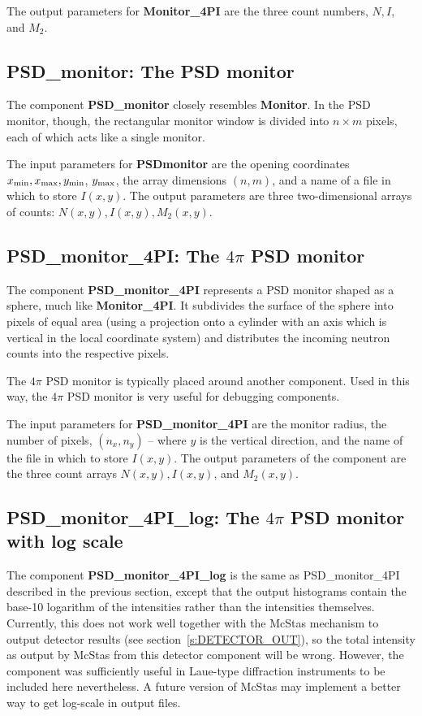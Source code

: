 The output parameters for {\bf Monitor\_4PI} are the three count numbers, $N, I$, and $M_2$.

\subsection{PSD\_monitor: The PSD monitor}
The component {\bf PSD\_monitor} closely resembles 
{\bf Monitor}.
In the PSD monitor, though, the rectangular monitor window is divided
into $n \times m$ pixels, each of which acts like a single
monitor.

The input parameters for {\bf PSD\-monitor} are
the opening coordinates $x_{\rm min}, x_{\rm max}, y_{\rm min}$, 
$y_{\rm max}$, the array dimensions $(n,m)$, and a name of a file in
which to store $I(x,y)$.
The output parameters are three two-dimensional arrays 
of counts: $N(x,y), I(x,y), M_2(x,y)$.

\subsection{PSD\_monitor\_4PI: The $4\pi$ PSD monitor}
The component {\bf PSD\_monitor\_4PI} represents 
a PSD monitor shaped as a sphere, much like {\bf Monitor\_4PI}.
It subdivides the surface of the sphere into pixels of equal 
area (using a projection onto a cylinder with an axis
which is vertical in the local coordinate system) 
and distributes the incoming neutron counts into the respective pixels.

The $4\pi$ PSD monitor is typically placed
around another component. Used in this way, 
the $4\pi$ PSD monitor is very useful for debugging components.

The input parameters for {\bf PSD\_monitor\_4PI} are
the monitor radius, the number of pixels, $(n_x, n_y)$ -- where
$y$ is the vertical direction, and the name of the file in which
to store $I(x,y)$. 
The output parameters of the component are the three count arrays
$N(x,y), I(x,y)$, and $M_2(x,y)$. 


\subsection{PSD\_monitor\_4PI\_log: The $4\pi$ PSD monitor with log scale}

The component {\bf PSD\_monitor\_4PI\_log} is the same as PSD\_monitor\_4PI
described in the previous section, except that the output histograms
contain the base-10 logarithm of the intensities rather than the
intensities themselves. Currently, this does not work well together with
the McStas mechanism to output detector results (see section~\ref{s:DETECTOR_OUT}), so
the total intensity as output by McStas from this detector component
will be wrong. However, the component was sufficiently useful in
Laue-type diffraction instruments to be included here nevertheless. A
future version of McStas may implement a better way to get log-scale in
output files.

